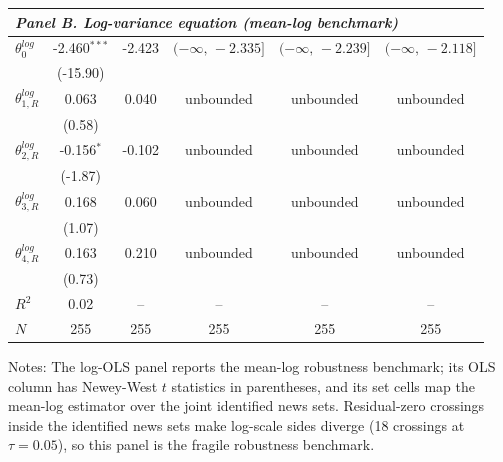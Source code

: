 \documentclass[11pt]{article}
\begin{document}
\begin{table}[!htbp]
\begin{threeparttable}
\begin{tabular}{lccccc}
\midrule
\multicolumn{6}{l}{\textit{Panel B. Log-variance equation (mean-log benchmark)}} \\
\midrule
$\theta^{log}_0$ & -2.460$^{***}$ & -2.423 & $(-\infty,\,-2.335]$ & $(-\infty,\,-2.239]$ & $(-\infty,\,-2.118]$ \\
 & (-15.90) &  &  &  &  \\
\midrule
$\theta^{log}_{1,R}$ & 0.063 & 0.040 & unbounded & unbounded & unbounded \\
 & (0.58) &  &  &  &  \\
$\theta^{log}_{2,R}$ & -0.156$^{*}$ & -0.102 & unbounded & unbounded & unbounded \\
 & (-1.87) &  &  &  &  \\
$\theta^{log}_{3,R}$ & 0.168 & 0.060 & unbounded & unbounded & unbounded \\
 & (1.07) &  &  &  &  \\
$\theta^{log}_{4,R}$ & 0.163 & 0.210 & unbounded & unbounded & unbounded \\
 & (0.73) &  &  &  &  \\
\midrule
$R^2$ & 0.02 & -- & -- & -- & -- \\
$N$ & 255 & 255 & 255 & 255 & 255 \\
\bottomrule
\end{tabular}
\begin{tablenotes}[flushleft]
\scriptsize
\item Notes: The log-OLS panel reports the mean-log robustness benchmark; its OLS column has Newey-West $t$ statistics in parentheses, and its set cells map the mean-log estimator over the joint identified news sets. Residual-zero crossings inside the identified news sets make log-scale sides diverge (18 crossings at $\tau{=}0.05$), so this panel is the fragile robustness benchmark.
\end{tablenotes}
\end{threeparttable}
\end{table}
\clearpage
\end{document}

